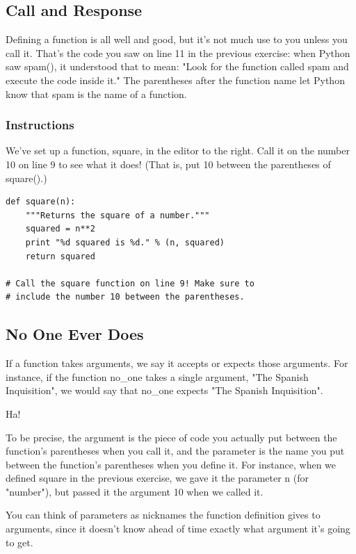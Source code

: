 \documentclass[12pt,a4paper,final,twoside,onecolumn,titlepage]{book}
\begin{document}
\subsection{Call and Response}

Defining a function is all well and good, but it's not much use to you unless you call it. That's the code you saw on line 11 in the previous exercise: when Python saw spam(), it understood that to mean: "Look for the function called spam and execute the code inside it." The parentheses after the function name let Python know that spam is the name of a function.

\subsubsection{Instructions}

We've set up a function, square, in the editor to the right. Call it on the number 10 on line 9 to see what it does! (That is, put 10 between the parentheses of square().)

\begin{lstlisting}
def square(n):
    """Returns the square of a number."""
    squared = n**2
    print "%d squared is %d." % (n, squared)
    return squared
    
# Call the square function on line 9! Make sure to
# include the number 10 between the parentheses.
\end{lstlisting}

\subsection{No One Ever Does}

If a function takes arguments, we say it accepts or expects those arguments. For instance, if the function no\_one takes a single argument, "The Spanish Inquisition", we would say that no\_one expects "The Spanish Inquisition".

Ha!

To be precise, the argument is the piece of code you actually put between the function's parentheses when you call it, and the parameter is the name you put between the function's parentheses when you define it. For instance, when we defined square in the previous exercise, we gave it the parameter n (for "number"), but passed it the argument 10 when we called it.

You can think of parameters as nicknames the function definition gives to arguments, since it doesn't know ahead of time exactly what argument it's going to get.
\end{document}
